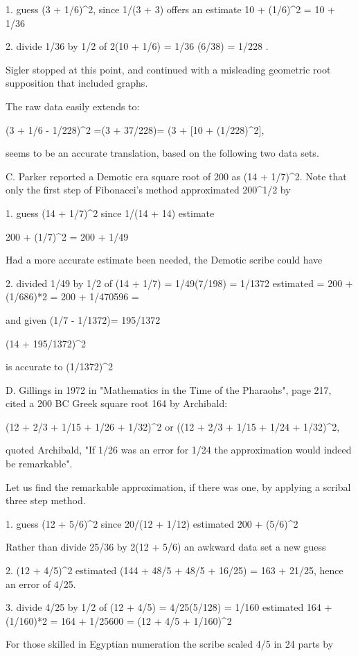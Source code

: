 \documentclass[12pt]{article}
\begin{document}
1. guess (3 + 1/6)^2, since 1/(3 + 3) offers an estimate 10 + (1/6)^2 = 10 + 1/36

2. divide 1/36 by 1/2 of 2(10 + 1/6) = 1/36 (6/38) = 1/228 .

Sigler stopped at this point, and continued with a misleading geometric root supposition that included graphs.

The raw data easily extends to:

(3 + 1/6 - 1/228)^2 =(3 + 37/228)= (3 + [10 + (1/228)^2],

seems to be an accurate translation, based on the following two data sets.

C. Parker reported a Demotic era square root of 200 as (14 + 1/7)^2. Note that only the first step of Fibonacci's method approximated 200^1/2 by

1. guess (14 + 1/7)^2 since 1/(14 + 14) estimate

200 + (1/7)^2 = 200 + 1/49

Had a more accurate estimate been needed, the Demotic scribe could have

2. divided 1/49 by 1/2 of (14 + 1/7) = 1/49(7/198) = 1/1372 estimated = 200 + (1/686)*2 = 200 + 1/470596 =

and given (1/7 - 1/1372)= 195/1372
  
(14 + 195/1372)^2

is accurate to (1/1372)^2

D. Gillings in 1972 in "Mathematics in the Time of the Pharaohs", page 217, cited a 200 BC Greek square root 164 by Archibald:

(12 + 2/3 + 1/15 + 1/26 + 1/32)^2 or ((12 + 2/3 + 1/15 + 1/24 + 1/32)^2,

quoted Archibald, "If 1/26 was an error for 1/24 the approximation would indeed be remarkable".

Let us find the remarkable approximation, if there was one, by applying a scribal three step method.

1. guess (12 + 5/6)^2 since 20/(12 + 1/12) estimated 200 + (5/6)^2

Rather than divide 25/36 by 2(12 + 5/6) an awkward data set a new guess

2. (12 + 4/5)^2 estimated (144 + 48/5 + 48/5 + 16/25) = 163 + 21/25, hence an error of 4/25.

3. divide 4/25 by 1/2 of (12 + 4/5) = 4/25(5/128) = 1/160 estimated 164 + (1/160)*2 = 164 + 1/25600 = (12 + 4/5 + 1/160)^2

For those skilled in Egyptian numeration the scribe scaled 4/5 in 24 parts by
\end{document}
